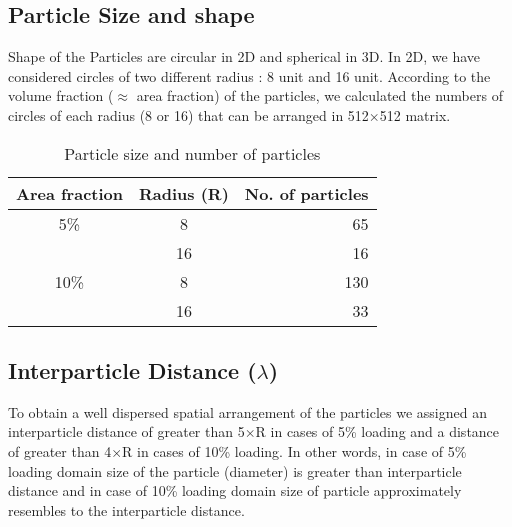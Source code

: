 \documentclass[12pt]{iiscthes}
\theoremstyle{definition}
\theoremstyle{definition}
\theoremstyle{remark}
\begin{document}
\subsection{Particle Size and shape}
Shape of the Particles are circular in 2D and spherical in 3D. In 2D, we have considered circles of two different radius : 8 unit and 16 unit. According to the volume fraction ($\approx$ area fraction) of the particles, we calculated the numbers of circles of each radius (8 or 16) that can be arranged in 512$\times$512 matrix.

\begin{table}[h]
\begin{center}
\begin{tabular}{|c|c|r|}
\hline
Area fraction & Radius (R) & No. of particles\\
\hline
 5\% &  8 & 65\\ 
\cline{2-3}
&16 & 16\\ 
\hline
10\% &  8 & 130 \\ \cline{2-3}
&16 & 33\\
\hline
\end{tabular}\caption{Particle size and number of particles}\label{ps}
\end{center}
\end{table}


\subsection{Interparticle Distance ($\lambda$)}
To obtain  a well dispersed spatial arrangement of the particles we assigned an interparticle distance of greater than 5$\times$R  in cases of 5\% loading and a distance of greater than 4$\times$R  in cases of 10\% loading.
In other words, in case of 5\% loading domain size of the particle (diameter) is greater than interparticle distance and in case of 10\% loading domain size of particle approximately resembles to the interparticle distance. 
\end{document}

